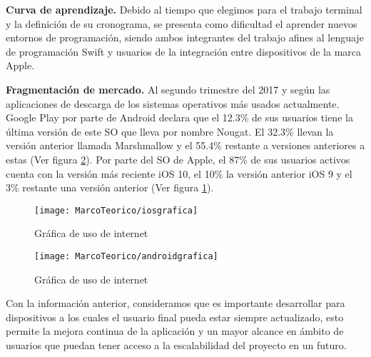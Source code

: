 	\textbf{Curva de aprendizaje.}
	Debido al tiempo que elegimos para el trabajo terminal y la definición de su cronograma, se presenta como dificultad el aprender nuevos entornos de programación, siendo ambos integrantes del trabajo afines al lenguaje de programación Swift y usuarios de la integración entre dispositivos de la marca Apple.
	
	\textbf{Fragmentación de mercado.}
	Al segundo trimestre del 2017 y según las aplicaciones de descarga de los sistemas operativos más usados actualmente. Google Play por parte de Android declara que el 12.3\% de sus usuarios tiene la última versión de este SO que lleva por nombre Nougat. El 32.3\% llevan la versión anterior llamada Marshmallow y el 55.4\% restante a versiones anteriores a estas (Ver figura \ref{fig:graficaandroid}). \cite{10} Por parte del SO de Apple, el 87\% de sus usuarios activos cuenta con la versión más reciente iOS 10, el 10\% la versión anterior iOS 9 y el 3\% restante una versión anterior (Ver figura \ref{fig:graficaiost}). 
		\begin{figure}[ht]
		\centering
		\caption{Gráfica de uso de internet}
		\label{fig:graficaiost}
		\texttt{[image: MarcoTeorico/iosgrafica]}
	\end{figure}
\begin{figure}[ht]
	\centering
	\caption{Gráfica de uso de internet}
	\label{fig:graficaandroid}
	\texttt{[image: MarcoTeorico/androidgrafica]}
\end{figure}


	Con la información anterior, consideramos que es importante desarrollar para dispositivos a los cuales el usuario final pueda estar siempre actualizado, esto permite la mejora continua de la aplicación y un mayor alcance en ámbito de usuarios que puedan tener acceso a la escalabilidad del proyecto en un futuro.

